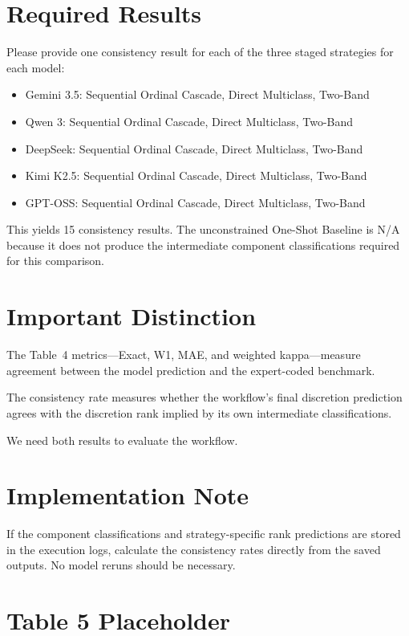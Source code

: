 \documentclass[11pt]{article}
\begin{document}
\section*{Required Results}

Please provide one consistency result for each of the three staged strategies for each model:

\begin{itemize}[nosep]
    \item Gemini 3.5: Sequential Ordinal Cascade, Direct Multiclass, Two-Band
    \item Qwen 3: Sequential Ordinal Cascade, Direct Multiclass, Two-Band
    \item DeepSeek: Sequential Ordinal Cascade, Direct Multiclass, Two-Band
    \item Kimi K2.5: Sequential Ordinal Cascade, Direct Multiclass, Two-Band
    \item GPT-OSS: Sequential Ordinal Cascade, Direct Multiclass, Two-Band
\end{itemize}

This yields 15 consistency results. The unconstrained One-Shot Baseline is N/A because it does not produce the intermediate component classifications required for this comparison.

\section*{Important Distinction}

The Table~4 metrics---Exact, W1, MAE, and weighted kappa---measure agreement between the model prediction and the expert-coded benchmark.

The consistency rate measures whether the workflow's final discretion prediction agrees with the discretion rank implied by its own intermediate classifications.

We need both results to evaluate the workflow.

\section*{Implementation Note}

If the component classifications and strategy-specific rank predictions are stored in the execution logs, calculate the consistency rates directly from the saved outputs. No model reruns should be necessary.

\section*{Table 5 Placeholder}
\end{document}
